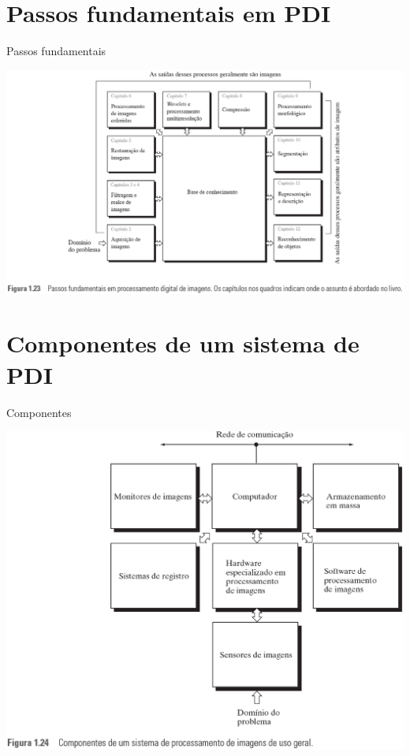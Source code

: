    \section[ slide = true]{Passos fundamentais em PDI}
   \begin{slide}[toc=]{Passos fundamentais}
      
       \begin{center}
         \includegraphics[width=1\textwidth]{figs/Fig0123}
         \end{center}
      
   \end{slide}
   
   \section[ slide = true]{Componentes de um sistema de PDI}
      \begin{slide}[toc=]{Componentes}
         \begin{center}
         \includegraphics[width=.7\textwidth]{figs/Fig0124}
         \end{center}
      \end{slide}
      

